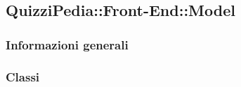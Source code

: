 \newpage

\subsection{QuizziPedia::Front-End::Model}
\subsubsection{Informazioni generali}
\subsubsection{Classi}
